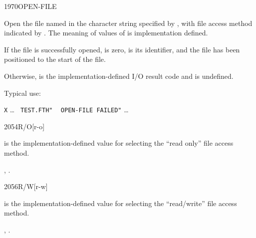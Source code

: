 \begin{worddef}{1970}{OPEN-FILE}
\item {}

	Open the file named in the character string specified by
	, with file access method indicated by
	. The meaning of values of  is
	implementation 	defined.

	If the file is successfully opened,  is zero,
	 is its identifier, and the file has been
	positioned to the start of the file.

	Otherwise,  is the implementation-defined I/O
	result code and  is undefined.

\see {}

	\begin{rationale} %
		Typical use:

		\tab \word[core]{:} \texttt{X} {\ldots}
				 \texttt{ TEST.FTH"} 
				~  \texttt{OPEN-FILE FAILED"}
			{\ldots} \word[core]{;}
	\end{rationale}
\end{worddef}


\begin{worddef}{2054}{R/O}[r-o]
\item {}

	 is the implementation-defined value for selecting
	the ``read only'' file access method.

\see {},
	.
\end{worddef}


\begin{worddef}{2056}{R/W}[r-w]
\item {}

	 is the implementation-defined value for selecting
	the ``read/write'' file access method.

\see {},
	.
\end{worddef}


